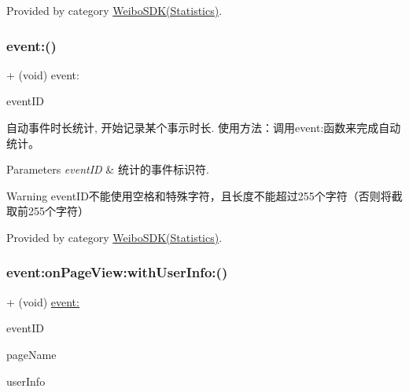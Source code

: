 Provided by category \mbox{\hyperlink{category_weibo_s_d_k_07_statistics_08_af035b5557e6dd544e282689323d8c4aa}{Weibo\+S\+D\+K(\+Statistics)}}.

\mbox{\label{interface_weibo_s_d_k_af035b5557e6dd544e282689323d8c4aa}} 
\subsubsection{\texorpdfstring{event\+:()}{event:()}\hspace{0.1cm}{\footnotesize\ttfamily [3/3]}}
{\footnotesize\ttfamily + (void) event\+: \begin{DoxyParamCaption}\item[{(N\+S\+String $\ast$)}]{event\+ID }\end{DoxyParamCaption}}

自动事件时长统计, 开始记录某个事示时长. 使用方法：调用event\+:函数来完成自动统计。 
\begin{DoxyParams}{Parameters}
{\em event\+ID} & 统计的事件标识符. \\
\hline
\end{DoxyParams}
\begin{DoxyWarning}{Warning}
event\+I\+D不能使用空格和特殊字符，且长度不能超过255个字符（否则将截取前255个字符） 
\end{DoxyWarning}


Provided by category \mbox{\hyperlink{category_weibo_s_d_k_07_statistics_08_af035b5557e6dd544e282689323d8c4aa}{Weibo\+S\+D\+K(\+Statistics)}}.

\mbox{\label{interface_weibo_s_d_k_a7c433640d9ed0d396166f2777a428277}} 
\subsubsection{\texorpdfstring{event\+:on\+Page\+View\+:with\+User\+Info\+:()}{event:onPageView:withUserInfo:()}\hspace{0.1cm}{\footnotesize\ttfamily [1/3]}}
{\footnotesize\ttfamily + (void) \mbox{\hyperlink{category_weibo_s_d_k_07_statistics_08_af035b5557e6dd544e282689323d8c4aa}{event\+:}} \begin{DoxyParamCaption}\item[{(N\+S\+String $\ast$)}]{event\+ID }\item[{onPageView:(N\+S\+String $\ast$)}]{page\+Name }\item[{withUserInfo:(N\+S\+Dictionary $\ast$)}]{user\+Info }\end{DoxyParamCaption}}

